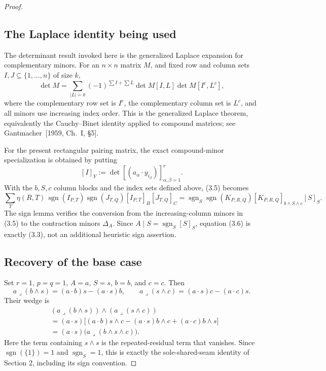 \documentclass[11pt]{article}
\begin{document}
\begin{proof}
\subsection{The Laplace identity being used}

The determinant result invoked here is the generalized Laplace expansion for
complementary minors. For an \(n\times n\) matrix \(M\), and fixed row and
column sets \(I,J\subseteq\{1,\ldots,n\}\) of size \(k\),
\[
\det M
 =\sum_{\lvert L\rvert=k}
   (-1)^{\sum I+\sum L}
   \det M[I,L]\det M[I^c,L^c],
\tag{3.5}
\]
where the complementary row set is \(I^c\), the complementary column set is
\(L^c\), and all minors use increasing index order. This is the generalized
Laplace theorem, equivalently the Cauchy--Binet identity applied to compound
matrices; see Gantmacher~[1959, Ch.~I, \S5].

For the present rectangular pairing matrix, the exact compound-minor
specialization is obtained by putting
\[
[I]_Y:=\det\!\left[(a_\alpha\cdot y_{i_\beta})\right]_
             {\alpha,\beta=1}^{r}.
\]
With the \(b,S,c\) column blocks and the index sets defined above, (3.5)
becomes
\[
\sum_T\eta(R,T)\,
\operatorname{sgn}(I_{P,T})\operatorname{sgn}(J_{T,Q})
[I_{P,T}]_B[J_{T,Q}]_C
=\operatorname{sgn}_S\operatorname{sgn}(K_{P,R,Q})
[K_{P,R,Q}]_{b\wedge S\wedge c}[S]_S.
\tag{3.6}
\]
The sign lemma verifies the conversion from the increasing-column minors in
(3.5) to the contraction minors \(\Delta_A\). Since
\(A\mid S=\operatorname{sgn}_S[S]_S\), equation (3.6) is exactly (3.3), not
an additional heuristic sign assertion.

\subsection{Recovery of the base case}

Set \(r=1\), \(p=q=1\), \(A=a\), \(S=s\), \(b=b\), and \(c=c\). Then
\[
a\mathbin{\lrcorner}(b\wedge s)=(a\cdot b)s-(a\cdot s)b,
\qquad
a\mathbin{\lrcorner}(s\wedge c)=(a\cdot s)c-(a\cdot c)s.
\]
Their wedge is
\[
\begin{aligned}
&(a\mathbin{\lrcorner}(b\wedge s))\wedge
  (a\mathbin{\lrcorner}(s\wedge c))\\
&=(a\cdot s)\bigl[
 (a\cdot b)s\wedge c-(a\cdot s)b\wedge c
 +(a\cdot c)b\wedge s\bigr]\\
&=(a\cdot s)\bigl(a\mathbin{\lrcorner}(b\wedge s\wedge c)\bigr).
\end{aligned}
\]
Here the term containing \(s\wedge s\) is the repeated-residual term that
vanishes. Since \(\operatorname{sgn}(\{1\})=1\) and
\(\operatorname{sgn}_S=1\), this is exactly the sole-shared-seam identity of
Section 2, including its sign convention.


\end{proof}
\end{document}
